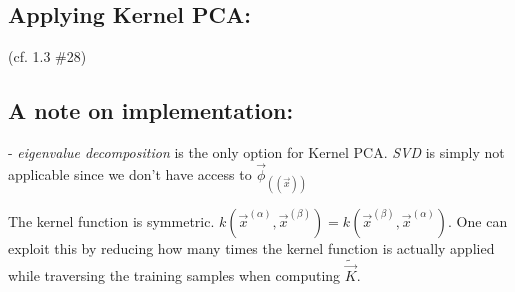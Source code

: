 

\subsection{Applying Kernel PCA:}



(cf. 1.3 \#28)

\subsection{A note on implementation:}


- \emph{eigenvalue decomposition} is the only option for Kernel PCA. \emph{SVD} is simply not applicable since we don't have access to $\vec \phi_((\vec x))$

The kernel function is symmetric. $k(\vec x^{(\alpha)}, \vec x^{(\beta)}) = k(\vec x^{(\beta)}, \vec x^{(\alpha)})$. One can exploit this by reducing how many times the kernel function is actually applied while traversing the training samples when computing $\widetilde {\vec{K}}$.
